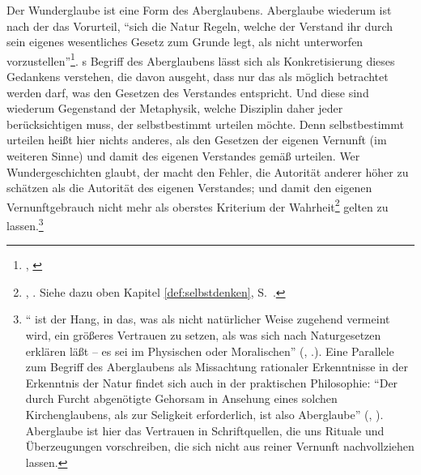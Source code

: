 Der Wunderglaube ist eine Form des Aberglaubens. Aberglaube wiederum ist nach
der  das Vorurteil, \enquote{sich die Natur
Regeln, welche der Verstand ihr durch sein eigenes wesentliches Gesetz zum
Grunde legt, als nicht unterworfen
vorzustellen}\footnote{\cite[][\S~40]{Kant:KritikderUrteilskraft2009},
\cite[][V: 294.22--24]{Kant:GesammelteWerke1900ff.}}.
s Begriff des Aberglaubens lässt sich als Konkretisierung
dieses Gedankens verstehen, die davon ausgeht, dass nur das als möglich betrachtet werden darf,
was den Gesetzen des Verstandes entspricht. Und diese sind wiederum Gegenstand
der Metaphysik, welche Disziplin daher jeder berücksichtigen muss, der
selbstbestimmt urteilen möchte. Denn selbstbestimmt urteilen heißt hier nichts
anderes, als den Gesetzen der eigenen Vernunft (im weiteren Sinne) und damit des
eigenen Verstandes gemäß urteilen. Wer Wundergeschichten glaubt, der macht
den Fehler, die Autorität anderer höher zu schätzen als die Autorität des
eigenen Verstandes; und damit den eigenen Vernunftgebrauch nicht mehr als
oberstes Kriterium der Wahrheit\footnote{\cite[Vgl.][A
329]{Kant:Washeisst:SichimDenkenorientieren?1977}, \cite[][VIII:
146.29--35]{Kant:GesammelteWerke1900ff.}. Siehe dazu oben Kapitel
\ref{def:selbstdenken}, S.~\pageref{def:selbstdenken}.} gelten zu
lassen.\footnote{\enquote{ ist der Hang, in das, was als nicht
natürlicher Weise zugehend vermeint wird, ein größeres Vertrauen zu setzen, als was sich nach
Naturgesetzen erklären läßt -- es sei im Physischen oder
Moralischen} \mkbibparens{\cite[][A 106]{Kant:DerStreitderFakultaeten1977},
\cite[][VII: 65.26--28]{Kant:GesammelteWerke1900ff.}.}.
Eine Parallele zum Begriff des Aberglaubens als Missachtung rationaler
Erkenntnisse in der Erkenntnis der Natur findet sich auch in der praktischen
Philosophie: \enquote{Der durch Furcht abgenötigte Gehorsam in Ansehung eines
solchen Kirchenglaubens, als zur Seligkeit erforderlich, ist also
Aberglaube} \mkbibparens{\cite[][A 108]{Kant:DerStreitderFakultaeten1977},
\cite[][VII: 66.36--38]{Kant:GesammelteWerke1900ff.}}. Aberglaube ist hier das
Vertrauen in Schriftquellen, die uns Rituale und Überzeugungen vorschreiben, die
sich nicht aus reiner Vernunft nachvollziehen lassen.}

